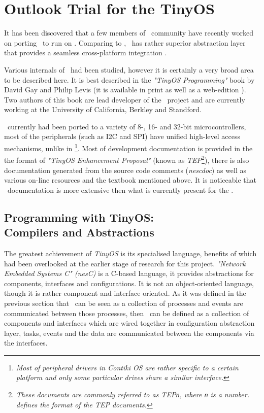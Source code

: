\section{Outlook Trial for the TinyOS} \label{sec:TINYOS}

  It has been discovered that a few members of \TinyOS\ community
 have recently worked on porting \TinyOS\ to run on 
 \cite{tinyos:arch:rfa1-p1,tinyos:arch:rfa1-p2}. Comparing to \Contiki,
 \TinyOS\ has rather superior abstraction layer that provides a seamless
 cross-platform integration \cite{tinyos:tepXXX,tinyos:tepYYY,tinyos:tepZZZ}.
 
  Various internals of \TinyOS\ had been studied, however it is 
 certainly a very broad area to be described here. It is best described
 in the \emph{"TinyOS Programming"} book by David Gay and Philip Levis
 (it is available in print as well as a web-edition \cite{tinyos:book}).
 Two authors of this book are lead developer of the \TinyOS\ project
 and are currently working at the University of California, Berkley
 and Standford.


  \TinyOS\ currently had been ported to a variety of 8-, 16- and
 32-bit microcontrollers, most of the peripherals (such as I2C and SPI)
 have unified high-level access mechanisms, unlike in \Contiki\footnote{
 \emph{Most of peripheral drivers in Contiki OS are rather specific to
 a certain platform and only some particular drives share a similar
 interface.}}. Most of development documentation is provided in the
 the format of \emph{"TinyOS Enhancement Proposal"} (known as
 \emph{TEP}\footnote{\emph{These documents are commonly referred to as
 TEP\texttt{n}, where \texttt{n} is a number.  defines the format
 of the TEP documents.}}), there is also documentation generated from
 the source code comments (\emph{nescdoc}) as well as various on-line
 resources \cite{tos:wiki:docs} and the textbook mentioned above.
 It is noticeable that \TinyOS\ documentation is more extensive then
 what is currently present for the \ContikiOS.


\subsection{Programming with TinyOS:\\Compilers and Abstractions}

  The greatest achievement of \emph{TinyOS} is its specialised language,
 benefits of which had been overlooked at the earlier stage of research
 for this project. \emph{"Network Embedded Systems C" (nesC)} is a
 C-based language, it provides abstractions for components, interfaces
 and configurations. It is not an object-oriented language, though
 it is rather component and interface oriented. As it was defined in
 the previous section that \Contiki\ can be seen as a collection of
 processes and events are communicated between those processes, then
 \TinyOS\ can be defined as a collection of components and interfaces
 which are wired together in configuration abstraction layer, tasks,
 events and the data are communicated between the components via the
 interfaces.

